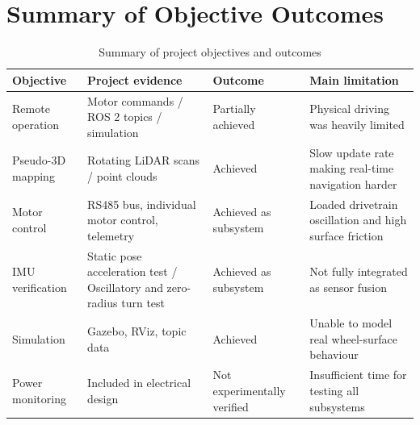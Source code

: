 \newpage
\section{Summary of Objective Outcomes}
\begin{table}[H]
\centering
\caption{Summary of project objectives and outcomes}
\label{tab:objectives_outcomes}
\renewcommand{\arraystretch}{1.25}
\begin{tabularx}{\textwidth}{p{3.2cm} X p{3.0cm} X}
\toprule
\textbf{Objective} & \textbf{Project evidence} & \textbf{Outcome} & \textbf{Main limitation} \\
\midrule
Remote operation & Motor commands / ROS 2 topics / simulation & Partially achieved & Physical driving was heavily limited \\
\midrule
Pseudo-3D mapping & Rotating LiDAR scans / point clouds & Achieved & Slow update rate making real-time navigation harder \\
\midrule
Motor control & RS485 bus, individual motor control, telemetry & Achieved as subsystem & Loaded drivetrain oscillation and high surface friction \\
\midrule
IMU verification & Static pose acceleration test / Oscillatory and zero-radius turn test & Achieved as subsystem & Not fully integrated as sensor fusion \\
\midrule
Simulation & Gazebo, RViz, topic data & Achieved & Unable to model real wheel-surface behaviour \\
\midrule
Power monitoring & Included in electrical design & Not experimentally verified & Insufficient time for testing all subsystems \\
\bottomrule
\end{tabularx}
\end{table}